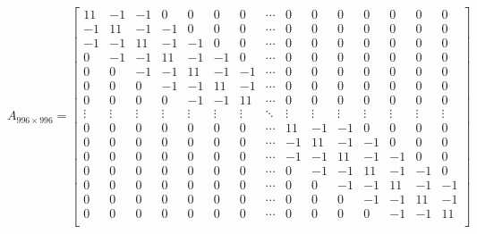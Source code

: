 \usepackage{amsmath}
\[
A_{996\times996}=\begin{bmatrix}
11& -1& -1& 0& 0& 0& 0& \cdots & 0& 0& 0& 0& 0& 0& 0 \\
-1& 11& -1& -1& 0& 0& 0& \cdots & 0& 0& 0& 0& 0& 0& 0 \\
-1& -1& 11& -1& -1& 0& 0& \cdots & 0& 0& 0& 0& 0& 0& 0 \\
0& -1& -1& 11& -1& -1& 0& \cdots & 0& 0& 0& 0& 0& 0& 0 \\
0& 0& -1& -1& 11& -1& -1& \cdots & 0& 0& 0& 0& 0& 0& 0 \\
0& 0& 0& -1& -1& 11& -1& \cdots & 0& 0& 0& 0& 0& 0& 0 \\
0& 0& 0& 0& -1& -1& 11& \cdots & 0& 0& 0& 0& 0& 0& 0 \\
\vdots & \vdots & \vdots & \vdots & \vdots & \vdots & \vdots & \ddots & \vdots & \vdots & \vdots & \vdots & \vdots & \vdots & \vdots \\
0& 0& 0& 0& 0& 0& 0& \cdots & 11& -1& -1& 0& 0& 0& 0 \\
0& 0& 0& 0& 0& 0& 0& \cdots & -1& 11& -1& -1& 0& 0& 0 \\
0& 0& 0& 0& 0& 0& 0& \cdots & -1& -1& 11& -1& -1& 0& 0 \\
0& 0& 0& 0& 0& 0& 0& \cdots & 0& -1& -1& 11& -1& -1& 0 \\
0& 0& 0& 0& 0& 0& 0& \cdots & 0& 0& -1& -1& 11& -1& -1 \\
0& 0& 0& 0& 0& 0& 0& \cdots & 0& 0& 0& -1& -1& 11& -1 \\
0& 0& 0& 0& 0& 0& 0& \cdots & 0& 0& 0& 0& -1& -1& 11 \\
\end{bmatrix}
\]